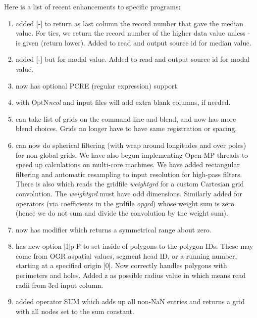 \noindent
Here is a list of recent enhancements to specific programs:

\begin{enumerate}
	\item {} added  to return as last column the record number that
		gave the median value.  For ties, we return the record number
		of the higher data value unless - is given (return lower).
		Added  to read and output source id for median value.
	\item {} added  but for modal value.
		Added  to read and output source id for modal value.
	\item {} now has optional PCRE (regular expression) support.
	\item {} with Opt{N}{\it ncol} and input files will add extra blank columns, if needed.
	\item {} can take list of grids on the command line and blend, and now has more blend choices.  Grids no
		longer have to have same registration or spacing.
	\item {} can now do spherical filtering (with wrap around longitudes and over poles) for non-global grids.
		We have also begun implementing Open MP threads to speed up calculations on multi-core machines.  We have
		added rectangular filtering and automatic resampling to input resolution for high-pass filters.  There is also
		 which reads the gridfile {\it weightgrd} for a custom Cartesian
		 grid convolution.  The {\it weightgrd} must have odd dimensions.  Similarly added 
		for operators (via coefficients in the grdfile {\it opgrd}) whose weight sum is zero (hence we do not sum
		and divide the convolution by the weight sum).
	\item {} now has modifier  which returns a symmetrical range about zero.
	\item {} has new option $|$I$|$p$|$P to set inside of polygons to the polygon IDs.
		These may come from OGR aspatial values, segment head ID,
		or a running number, starting at a specified origin [0].  Now correctly handles polygons with perimeters and holes.
		Added z as possible radius value in  which means read radii from 3rd input column.
	\item {} added operator SUM which adds up all non-NaN entries and returns a grid with all nodes set to the sum constant.

\end{enumerate}
